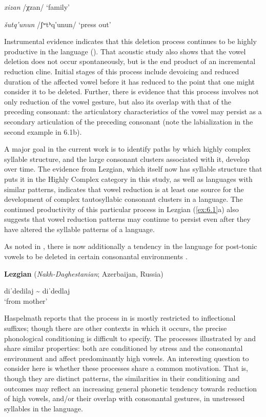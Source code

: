 \textit{xizan}      /χzan/      ‘family’

\textit{šutq’unun}    /ʃʷtʰq’unun/    ‘press out’
\citep[36-8]{Haspelmath1993}
\z
\z

  Instrumental evidence indicates that this deletion process continues to be highly productive in the language (\citealt{ChitoranBabaliyeva2007}). That acoustic study also shows that the vowel deletion does not occur spontaneously, but is the end product of an incremental reduction cline. Initial stages of this process include devoicing and reduced duration of the affected vowel before it has reduced to the point that one might consider it to be deleted. Further, there is evidence that this process involves not only reduction of the vowel gesture, but also its overlap with that of the preceding consonant: the articulatory characteristics of the vowel may persist as a secondary articulation of the preceding consonant (note the labialization in the second example in 6.1b).

  A major goal in the current work is to identify paths by which highly complex syllable structure, and the large consonant clusters associated with it, develop over time. The evidence from Lezgian, which itself now has syllable structure that puts it in the Highly Complex category in this study, as well as languages with similar patterns, indicates that vowel reduction is at least one source for the development of complex tautosyllabic consonant clusters in a language. The continued productivity of this particular process in Lezgian (\ref{ex:6.1}a) also suggests that vowel reduction patterns may continue to persist even after they have altered the syllable patterns of a language. 

  As noted in , there is now additionally a tendency in the language for post-tonic vowels to be deleted in certain consonantal environments .

\ea\label{ex:6.2}
  \textbf{Lezgian} (\textit{Nakh-Daghestanian}; Azerbaijan, Russia)

diˈdedilaj {\textasciitilde} diˈdedlaj\\
\glt ‘from mother’
\citep[40]{Haspelmath1993}
\z

Haspelmath reports that the process in  is mostly restricted to inflectional suffixes; though there are other contexts in which it occurs, the precise phonological conditioning is difficult to specify. The processes illustrated by  and  share similar properties: both are conditioned by stress and the consonantal environment and affect predominantly high vowels. An interesting question to consider here is whether these processes share a common motivation. That is, though they are distinct patterns, the similarities in their conditioning and outcomes may reflect an increasing general phonetic tendency towards reduction of high vowels, and/or their overlap with consonantal gestures, in unstressed syllables in the language.

